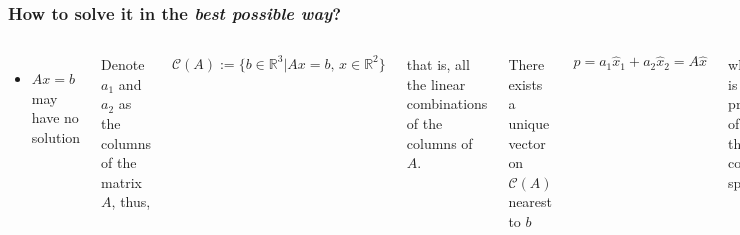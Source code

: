 \documentclass[aspectratio=169]{beamer}
\newcommand{\incfig}[2][1]{%
    \def\svgwidth{#1\columnwidth}
    {#2.pdf_tex} }
\begin{document}
\begin{frame} %
	\frametitle{How to solve it in the \textit{best possible way}?}
	
	\begin{columns}

	\begin{itemize}
		\item $Ax = b$ may have no solution
	\end{itemize}	

	Denote $a_1$ and $a_2$ as the columns of the matrix $A$, thus,

	\[ \mathcal{C}(A) := \{ b \in \mathbb{R}^3 | Ax = b, \, x \in \mathbb{R}^2 \} \]

	that is, all the linear combinations of the columns of $A$.

	There exists a unique vector on $\mathcal{C}(A)$ nearest to $b$

	\[ p = a_1 \hat{x}_1 + a_2 \hat{x}_2 = A\hat{x} \] 

	\noindent where $p$ is the projection of $b$ onto the column space!
\begin{itemize}
	\item A possible alternative $A \hat{x} = p$ 
\end{itemize}

\begin{figure}[ht]
    \centering
    \incfig{mainissue}
    \label{fig:mainissue}
\end{figure}

\end{columns}
\end{frame}
\end{document}
